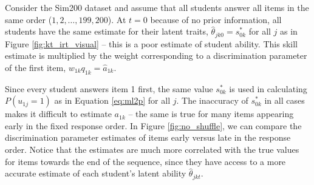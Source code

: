 Consider the Sim200 dataset and assume that all students answer all items in the same order ($1, 2, \ldots,199,200$). At $t=0$ because of no prior information, all students have the same estimate for their latent traits, $\hat{\theta}_{jk0} = s_{0k}^*$ for all $j$ as in Figure \ref{fig:kt_irt_visual} -- this is a poor estimate of student ability. This skill estimate is multiplied by the weight corresponding to a discrimination parameter of the first item, $w_{1k}q_{1k} = \hat a_{1k}$. 

Since every student answers item 1 first, the same value $s_{0k}^*$ is used in calculating $P(u_{1j} = 1)$ as in Equation \ref{eq:ml2p} for all $j$. The inaccuracy of $s_{0k}^*$ in all cases makes it difficult to estimate $a_{1k}$ -- the same is true for many items appearing early in the fixed response order. In Figure \ref{fig:no_shuffle}, we can compare the discrimination parameter estimates of items early versus late in the response order. Notice that the estimates are much more correlated with the true values for items towards the end of the sequence, since they have access to a more accurate estimate of each student's latent ability $\hat \theta_{jkt}$.

